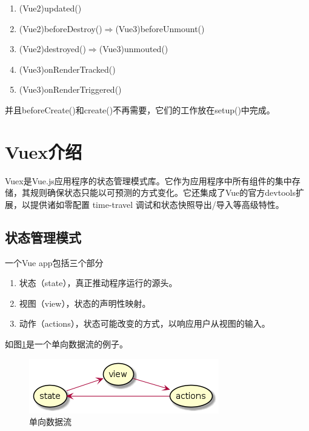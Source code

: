 \begin{enumerate}
\begin{enumerate}[label=\circled{\arabic*}]
\begin{enumerate}
                  \item (Vue2)updated()
                  \item (Vue2)beforeDestroy()$\Rightarrow$(Vue3)beforeUnmount()
                  \item (Vue2)destroyed()$\Rightarrow$(Vue3)unmouted()
                  \item (Vue3)onRenderTracked()
                  \item (Vue3)onRenderTriggered()
                \end{enumerate}
                并且beforeCreate()和create()不再需要，它们的工作放在setup()中完成。
        \end{enumerate}
\end{enumerate}

\section{Vuex介绍}

Vuex是Vue.js应用程序的状态管理模式库。它作为应用程序中所有组件的集中存储，其规则确保状态只能以可预测的方式变化。它还集成了Vue的官方devtools扩展，以提供诸如零配置 time-travel 调试和状态快照导出/导入等高级特性。

\subsection{状态管理模式}

一个Vue app包括三个部分
\begin{enumerate}[label=\circled{\arabic*}]
  \item 状态（state），真正推动程序运行的源头。
  \item 视图（view），状态的声明性映射。
  \item 动作（actions），状态可能改变的方式，以响应用户从视图的输入。
\end{enumerate}

如图\ref{vuex-one-way-data-flow}是一个单向数据流的例子。

\begin{figure}[htbp]
  \centering
  \includegraphics[scale = 0.6]{out/uml/部署图/vuex-one-way-data-flow/vuex-one-way-data-flow.png}
  \caption{\song\wuhao 单向数据流}
  \label{vuex-one-way-data-flow}
\end{figure}

